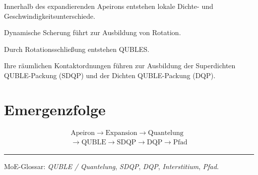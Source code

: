 \documentclass[11pt,a4paper]{article}
\begin{document}
Innerhalb des expandierenden
Apeirons entstehen lokale
Dichte- und
Geschwindigkeitsunterschiede.

Dynamische Scherung führt
zur Ausbildung von Rotation.

Durch Rotationsschließung
entstehen QUBLES.

Ihre räumlichen Kontaktordnungen
führen zur Ausbildung der
Superdichten QUBLE-Packung (SDQP)
und der Dichten QUBLE-Packung (DQP).

\section*{Emergenzfolge}

\[
\begin{gathered}
\text{Apeiron}
\rightarrow
\text{Expansion}
\rightarrow
\text{Quantelung}
\\[0.4em]
\rightarrow
\text{QUBLE}
\rightarrow
\text{SDQP}
\rightarrow
\text{DQP}
\rightarrow
\text{Pfad}
\end{gathered}
\]

\vspace{0.9em}
\hrule
\vspace{0.45em}

{\footnotesize
MoE-Glossar:
\emph{QUBLE / Quantelung},
\emph{SDQP},
\emph{DQP},
\emph{Interstitium},
\emph{Pfad}.
}
\end{document}
